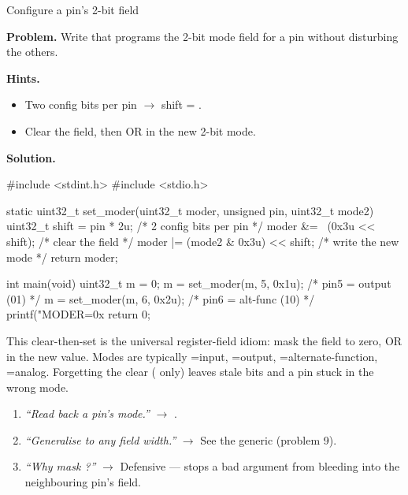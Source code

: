 \begin{gymproblem}{Configure a pin's 2-bit  field}

\textbf{Problem.} Write  that programs the
2-bit mode field for a pin without disturbing the others.

\textbf{Hints.}
\begin{itemize}
\item Two config bits per pin $\rightarrow$ shift = .
\item Clear the field, then OR in the new 2-bit mode.
\end{itemize}

\attempt

\textbf{Solution.}
\begin{cgym}
#include <stdint.h>
#include <stdio.h>

static uint32_t set_moder(uint32_t moder, unsigned pin, uint32_t mode2) {
    uint32_t shift = pin * 2u;          /* 2 config bits per pin */
    moder &= ~(0x3u << shift);          /* clear the field       */
    moder |= (mode2 & 0x3u) << shift;   /* write the new mode    */
    return moder;
}

int main(void) {
    uint32_t m = 0;
    m = set_moder(m, 5, 0x1u);   /* pin5 = output (01)   */
    m = set_moder(m, 6, 0x2u);   /* pin6 = alt-func (10) */
    printf("MODER=0x%
    return 0;
}
\end{cgym}

This clear-then-set is the universal register-field idiom: mask the field to
zero, OR in the new value. Modes are typically =input,
=output, =alternate-function, =analog. Forgetting
the clear (\code{|=} only) leaves stale bits and a pin stuck in the wrong mode.

\followups
\begin{enumerate}
\item \emph{``Read back a pin's mode.''} $\rightarrow$
  .
\item \emph{``Generalise to any field width.''} $\rightarrow$ See the generic
   (problem 9).
\item \emph{``Why mask ?''} $\rightarrow$ Defensive ---
  stops a bad argument from bleeding into the neighbouring pin's field.
\end{enumerate}
\end{gymproblem}


